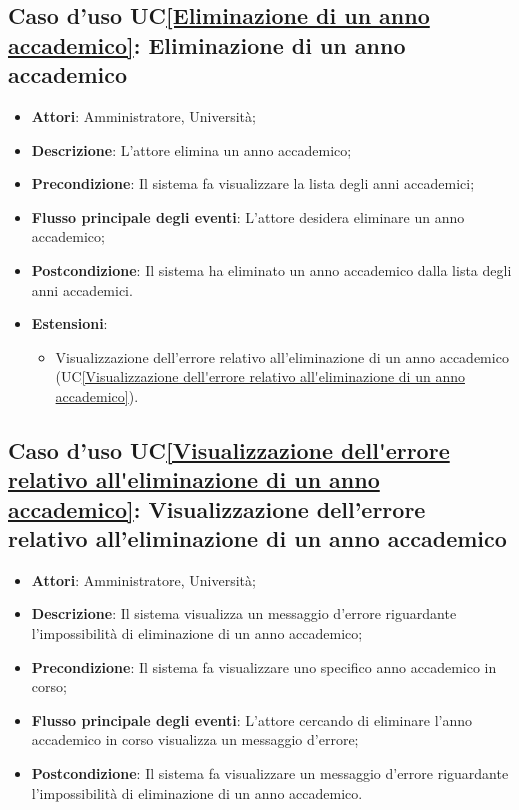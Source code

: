 \subsection{Caso d'uso UC\ref{Eliminazione di un anno accademico}: Eliminazione di un anno accademico}
\begin{itemize}
	\item \textbf{Attori}: Amministratore, Università;
	\item \textbf{Descrizione}: L'attore elimina un anno accademico;
	\item \textbf{Precondizione}: Il sistema fa visualizzare la lista degli anni accademici;
	\item \textbf{Flusso principale degli eventi}: L'attore desidera eliminare un anno accademico;
	\item \textbf{Postcondizione}: Il sistema ha eliminato un anno accademico dalla lista degli anni accademici.
	
	\item \textbf{Estensioni}:
	\begin{itemize}
		\item Visualizzazione dell'errore relativo all'eliminazione di un anno accademico (UC\ref{Visualizzazione dell'errore relativo all'eliminazione di un anno accademico}).
	\end{itemize}
\end{itemize}


\subsection{Caso d'uso UC\ref{Visualizzazione dell'errore relativo all'eliminazione di un anno accademico}: Visualizzazione dell'errore relativo all'eliminazione di un anno accademico}
\begin{itemize}
	\item \textbf{Attori}: Amministratore, Università;
	\item \textbf{Descrizione}: Il sistema visualizza un messaggio d'errore riguardante l'impossibilità di eliminazione di un anno accademico;
	\item \textbf{Precondizione}: Il sistema fa visualizzare uno specifico anno accademico in corso;
	\item \textbf{Flusso principale degli eventi}: L'attore cercando di eliminare l'anno accademico in corso visualizza un messaggio d'errore;
	\item \textbf{Postcondizione}: Il sistema fa visualizzare un messaggio d'errore riguardante l'impossibilità di eliminazione di un anno accademico.
	
\end{itemize}


